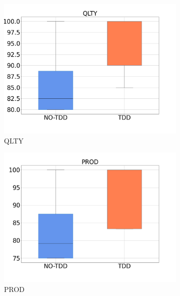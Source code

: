 \begin{figure}[htbp]
    \centering
    \begin{subfigure}{0.33\textwidth}
        \includegraphics[width=\linewidth]{figures/box_plots/task3/QLTY.png}
        \caption{QLTY}
        \label{bp_task3_qlty}
    \end{subfigure}\hfil
        \begin{subfigure}{0.33\textwidth}
        \includegraphics[width=\linewidth]{figures/box_plots/task3/PROD.png}
        \caption{PROD}
        \label{bp_task3_prod}
    \end{subfigure}\hfil
    \begin{subfigure}{0.33\textwidth}

\end{subfigure}
\end{figure}

